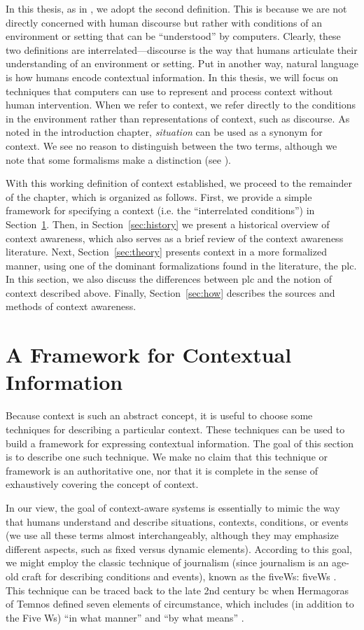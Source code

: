 In this thesis, as in \cite{chen_geospatial_2014}, we adopt the second definition. This is because we are not directly concerned with human discourse but rather with conditions of an environment or setting that can be ``understood'' by computers. Clearly, these two definitions are interrelated---discourse is the way that humans articulate their understanding of an environment or setting. Put in another way, natural language is how humans encode contextual information. In this thesis, we will focus on techniques that computers can use to represent and process context without human intervention. When we refer to context, we refer directly to the conditions in the environment rather than representations of context, such as discourse. As noted in the introduction chapter, \emph{situation} can be used as a synonym for context. We see no reason to distinguish between the two terms, although we note that some formalisms make a distinction (see \cite{akman1996steps}).

With this working definition of context established, we proceed to the remainder of the chapter, which is organized as follows. First, we provide a simple framework for specifying a context (i.e. the ``interrelated conditions'') in Section~\ref{sec:framework}. Then, in Section~\ref{sec:history} we present a historical overview of context awareness, which also serves as a brief review of the context awareness literature. Next, Section~\ref{sec:theory} presents context in a more formalized manner, using one of the dominant formalizations found in the literature, the \gls{plc}. In this section, we also discuss the differences between \gls{plc} and the notion of context described above. Finally, Section~\ref{sec:how} describes the sources and methods of context awareness.

\section{A Framework for Contextual Information}
\label{sec:framework}

Because context is such an abstract concept, it is useful to choose some techniques for describing a particular context. These techniques can be used to build a framework for expressing contextual information. The goal of this section is to describe one such technique. We make no claim that this technique or framework is an authoritative one, nor that it is complete in the sense of exhaustively covering the concept of context.

In our view, the goal of context-aware systems is essentially to mimic the way that humans understand and describe situations, contexts, conditions, or events (we use all these terms almost interchangeably, although they may emphasize different aspects, such as fixed versus dynamic elements). According to this goal, we might employ the classic technique of journalism (since journalism is an age-old craft for describing conditions and events), known as the \acrshort{fiveWs}: \acrlong{fiveWs} . This technique can be traced back to the late 2nd century \acrshort{bc} when Hermagoras of Temnos defined seven elements of circumstance, which includes (in addition to the Five Ws) ``in what manner'' and ``by what means'' \cite{bennett2005hermagoras}.

